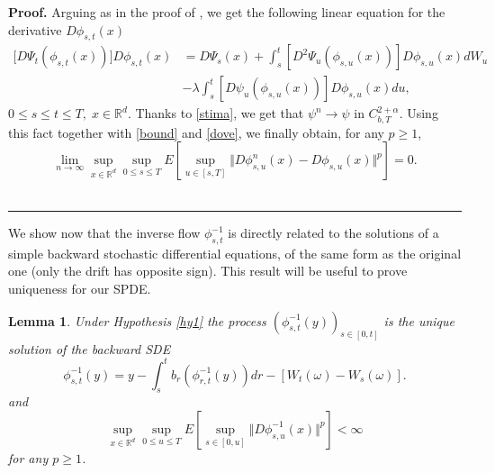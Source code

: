 \documentclass[a4paper,10pt]{article}
\newtheorem{lemma}[theorem]{Lemma}
\newenvironment{proof}[1][Proof]{\textbf{#1.} }{\ \rule{0.5em}{0.5em}}
\begin{document}
\begin{proof}
 Arguing as in the proof of \cite[Theorem II.3.1]{K}, we get the
 following linear equation for the derivative $D\phi_{s,t}(x)$
\begin{equation} \label{dove}
\begin{split}
 \lbrack D\Psi_{t}(\phi_{s,t}(x))] D\phi_{s,t}(x)  &  =D\Psi_{s}(x)
  +\int_{s}
^{t}[D^{2}\Psi_{u} (\phi_{s,u}(x))]D\phi_{s,u}(x)dW_{u}\\
& -\lambda\int_{s}^{t}[D\psi_{u}(\phi_{s,u}(x))]D\phi_{s,u}(x)du,
\end{split}
\end{equation}
$ 0 \le s\le t \le T, \; x \in \mathbb{R}^d.$ Thanks to
\eqref{stima}, we get that  $\psi^{n}\rightarrow\psi$ in
$C_{b,T}^{2+{\alpha}}$. Using this fact together with
\eqref{bound} and \eqref{dove}, we finally obtain, for any $p\geq
1$,
\begin{equation} \label{stima1}
\lim_{n\rightarrow\infty}\sup_{x\in{\mathbb{R}}^{d}}\sup_{0\leq
s\leq T} E[\sup_{u \in [s,T]}\Vert
D\phi_{s,u}^{n}(x)-D\phi_{s,u}(x)\Vert^{p}]=0.
\end{equation}
\end{proof}

\vskip 2mm We show now that the inverse flow ${\phi}_{s,t}^{-1}$
is directly related to the solutions of a simple backward
stochastic differential equations, of the same form as the
original one (only the drift has opposite sign). This result will
be useful   to prove uniqueness for our SPDE.


\begin{lemma}\label{fra}
\bigskip
Under  Hypothesis \ref{hy1} the process $\left(
\phi_{s,t}^{-1}\left(  y\right)  \right) _{s\in\left[ 0,t\right]
}$ is the unique solution of the backward SDE
\[
\phi_{s,t}^{-1}\left(  y\right)  =y-\int_{s}^{t}b_{r}\left(  \phi_{r,t}%
^{-1}\left(  y\right)  \right)  dr-\left[  W_{t}\left(
\omega\right) -W_{s}\left(  \omega\right)  \right].
\]
and
\begin{equation}
\sup_{x\in{\mathbb{R}}^{d}} \sup_{0\leq u \leq T}  E[\sup_{s \in [0,u]}\Vert D\phi^{-1}_{s,u}%
(x)\Vert^{p}]<\infty
 \label{bound-inv}
\end{equation}
for any $p\ge 1$.
\end{lemma}
\end{document}
